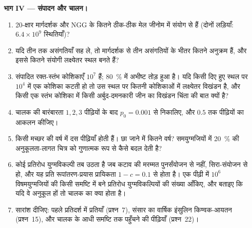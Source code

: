 \begin{problem}
\medskip
\noindent\textbf{भाग IV --- संपादन और चालन।}
\begin{enumerate}[resume]
  \item 20-क्षार मार्गदर्शक और NGG के कितने ठीक-ठीक मेल जीनोम में
        संयोग से हैं (दोनों लड़ियाँ: $6.4\times 10^{9}$
        स्थितियाँ)?
  \item यदि  तीन तक असंगतियाँ सह ले, तो मार्गदर्शक से तीन
        असंगतियों के भीतर कितने अनुक्रम हैं, और इससे कितने संयोगी
        लक्ष्येतर स्थल बनते हैं?
  \item संपादित रक्त-स्तंभ कोशिकाएँ $10^{7}$ हैं; \qty{80}{\%} में
        अभीष्ट तोड़ हुआ है। यदि किसी दिए हुए स्थल पर $10^{4}$ में एक
        कोशिका कटती हो तो उस स्थल पर कितनी कोशिकाओं में लक्ष्येतर
        विखंडन है, और किसी एक स्तंभ कोशिका में किसी अर्बुद-दमनकारी जीन
        का विखंडन चिंता की बात क्यों है?
  \item चालक की बारंबारता $1, 2, 3$ पीढ़ियों के बाद
        $p_{0} = 0.001$ से निकालिए, और $0.5$ तक पीढ़ियों का आकलन कीजिए।
  \item किसी मच्छर की वर्ष में दस पीढ़ियाँ होती हैं। छा जाने में कितने
        वर्ष? समयुग्मजियों में \qty{20}{\%} की अनुकूलता-लागत चित्र को
        गुणात्मक रूप से कैसे बदल देती है?
  \item कोई प्रतिरोध युग्मविकल्पी तब उठता है जब कटाव की मरम्मत
        पुनर्संयोजन से नहीं, सिरा-संयोजन से हो, और यह प्रति
        रूपांतरण-प्रयास प्रायिकता $1 - c = 0.1$ से होता है। एक पीढ़ी
        में $10^{6}$ विषमयुग्मजियों की किसी समष्टि में बने प्रतिरोध
        युग्मविकल्पियों की संख्या आँकिए, और बताइए कि यदि वे अनुकूल
        हों तो चालक का क्या होता है।
  \item सारांश दीजिए: पहले प्रतिदर्श में प्रतियाँ (प्रश्न~7), संसार का
        वार्षिक इंसुलिन किण्वक-आयतन (प्रश्न~15), और चालक के आधी
        समष्टि तक पहुँचने की पीढ़ियाँ (प्रश्न~22)।
\end{enumerate}
\end{problem}
